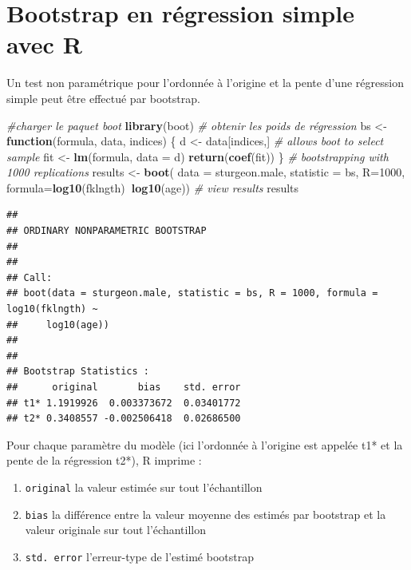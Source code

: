 \documentclass[12pt,]{book}
\newenvironment{Shaded}{\begin{snugshade}}{\end{snugshade}}
\newcommand{\CommentTok}[1]{\textcolor[rgb]{0.37,0.37,0.37}{\textit{#1}}}
\newcommand{\ControlFlowTok}[1]{\textcolor[rgb]{0.27,0.27,0.27}{\textbf{#1}}}
\newcommand{\DataTypeTok}[1]{\textcolor[rgb]{0.27,0.27,0.27}{#1}}
\newcommand{\DecValTok}[1]{\textcolor[rgb]{0.06,0.06,0.06}{#1}}
\newcommand{\KeywordTok}[1]{\textcolor[rgb]{0.27,0.27,0.27}{\textbf{#1}}}
\newcommand{\NormalTok}[1]{#1}
\newcommand{\OperatorTok}[1]{\textcolor[rgb]{0.43,0.43,0.43}{\textbf{#1}}}
\newcommand{\StringTok}[1]{\textcolor[rgb]{0.5,0.5,0.5}{#1}}
\providecommand{\tightlist}{%
  \setlength{\itemsep}{0pt}\setlength{\parskip}{0pt}}
\begin{document}
\hypertarget{bootstrap-en-ruxe9gression-simple-avec-r}{%
\section{Bootstrap en régression simple avec R}\label{bootstrap-en-ruxe9gression-simple-avec-r}}

Un test non paramétrique pour l'ordonnée à l'origine et la pente d'une régression simple peut être effectué par bootstrap.

\begin{Shaded}
\begin{Highlighting}[]
\CommentTok{#charger le paquet boot}
\KeywordTok{library}\NormalTok{(boot)}
\CommentTok{# obtenir les poids de régression}
\NormalTok{bs <-}\StringTok{ }\ControlFlowTok{function}\NormalTok{(formula, data, indices) \{}
\NormalTok{  d <-}\StringTok{ }\NormalTok{data[indices,] }\CommentTok{# allows boot to select sample}
\NormalTok{  fit <-}\StringTok{ }\KeywordTok{lm}\NormalTok{(formula, }\DataTypeTok{data =}\NormalTok{ d)}
  \KeywordTok{return}\NormalTok{(}\KeywordTok{coef}\NormalTok{(fit))}
\NormalTok{\}}
\CommentTok{# bootstrapping with 1000 replications}
\NormalTok{results <-}\StringTok{ }\KeywordTok{boot}\NormalTok{(}
  \DataTypeTok{data =}\NormalTok{ sturgeon.male,}
  \DataTypeTok{statistic =}\NormalTok{ bs,}
  \DataTypeTok{R=}\DecValTok{1000}\NormalTok{, }\DataTypeTok{formula=}\KeywordTok{log10}\NormalTok{(fklngth)}\OperatorTok{~}\KeywordTok{log10}\NormalTok{(age))}
\CommentTok{# view results}
\NormalTok{results}
\end{Highlighting}
\end{Shaded}

\begin{verbatim}
## 
## ORDINARY NONPARAMETRIC BOOTSTRAP
## 
## 
## Call:
## boot(data = sturgeon.male, statistic = bs, R = 1000, formula = log10(fklngth) ~ 
##     log10(age))
## 
## 
## Bootstrap Statistics :
##      original       bias    std. error
## t1* 1.1919926  0.003373672  0.03401772
## t2* 0.3408557 -0.002506418  0.02686500
\end{verbatim}

Pour chaque paramètre du modèle (ici l'ordonnée à l'origine est
appelée t1* et la pente de la régression t2*), R imprime :

\begin{enumerate}
\def\labelenumi{\arabic{enumi}.}
\tightlist
\item
  \texttt{original} la valeur estimée sur tout l'échantillon
\item
  \texttt{bias} la différence entre la valeur moyenne des estimés par bootstrap et la valeur originale sur tout l'échantillon
\item
  \texttt{std.\ error} l'erreur-type de l'estimé bootstrap
\end{enumerate}
\end{document}
